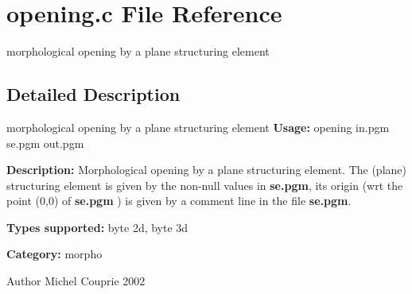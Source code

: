\section{opening.c File Reference}
\label{opening_8c}


morphological opening by a plane structuring element  




\subsection{Detailed Description}
morphological opening by a plane structuring element {\bfseries Usage:} opening in.pgm se.pgm out.pgm

{\bfseries Description:} Morphological opening by a plane structuring element. The (plane) structuring element is given by the non-\/null values in {\bfseries se.pgm}, its origin (wrt the point (0,0) of {\bfseries se.pgm} ) is given by a comment line in the file {\bfseries se.pgm}.

{\bfseries Types supported:} byte 2d, byte 3d

{\bfseries Category:} morpho

\begin{DoxyAuthor}{Author}
Michel Couprie 2002 
\end{DoxyAuthor}
